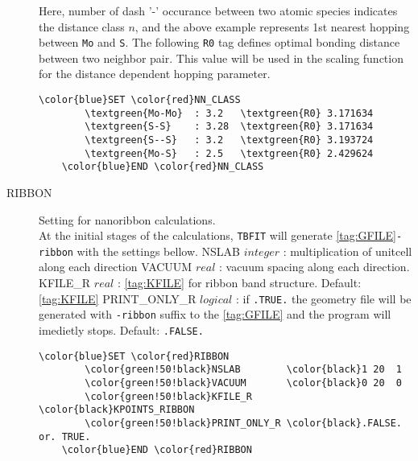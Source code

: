 \documentclass[a4paper,12pt]{scrartcl}
\makeatletter
\def\namedlabel#1#2{\begingroup
    #2%
    \def\@currentlabel{#2}%
    \phantomsection\label{#1}\endgroup
}
\newcommand{\tbfitname}{\textcolor{blue!85!white}{\texttt{TBFIT}}}
\newcommand{\textgreen}[1]{\textcolor{green!50!black}{\texttt{#1}}}
\makeatother
\begin{document}
\begin{description}
		Here, number of dash '-' occurance between two atomic species indicates 
		the distance class $n$, and the above example represents 1st nearest 
		hopping between \texttt{Mo} and \texttt{S}. The following \texttt{R0}
		tag defines optimal bonding distance between two neighbor pair. 
		This value will be used in the scaling function for the distance
		dependent hopping parameter.

 \begin{Verbatim}[commandchars=\\\{\},gobble=4, frame=single, framesep=2mm, 
    label= NN\_CLASS setup example,
    labelposition=bottomline]
    \color{blue}SET \color{red}NN_CLASS
        \textgreen{Mo-Mo}  : 3.2   \textgreen{R0} 3.171634
        \textgreen{S-S}    : 3.28  \textgreen{R0} 3.171634  
        \textgreen{S--S}   : 3.2   \textgreen{R0} 3.193724  
        \textgreen{Mo-S}   : 2.5   \textgreen{R0} 2.429624  
    \color{blue}END \color{red}NN_CLASS
 \end{Verbatim}


 	\item[\namedlabel{tag:RIBBON}{RIBBON}]
		Setting for nanoribbon calculations. \\
		At the initial stages of the calculations, \tbfitname{} will generate
		\ref{tag:GFILE}\texttt{-ribbon} with the settings bellow.
		\subitem NSLAB $integer$ : multiplication of unitcell along each direction
		\subitem VACUUM  $real$  : vacuum spacing along each direction.
		\subitem KFILE\_R $real$  : \ref{tag:KFILE} for ribbon band structure. 
			Default: \ref{tag:KFILE}
		\subitem PRINT\_ONLY\_R $logical$  : if \texttt{.TRUE.} the geometry
		file will be generated with \texttt{-ribbon} suffix to the \ref{tag:GFILE}
		and the program will imedietly stops. Default: \texttt{.FALSE.}
		
 \begin{Verbatim}[commandchars=\\\{\},gobble=4, frame=single, framesep=2mm, 
    label= Ribbon calculation setup,
    labelposition=bottomline]
    \color{blue}SET \color{red}RIBBON
        \color{green!50!black}NSLAB        \color{black}1 20  1
        \color{green!50!black}VACUUM       \color{black}0 20  0
        \color{green!50!black}KFILE_R      \color{black}KPOINTS_RIBBON
        \color{green!50!black}PRINT_ONLY_R \color{black}.FALSE. or. TRUE.
    \color{blue}END \color{red}RIBBON
 \end{Verbatim}



\end{description}
\end{document}
